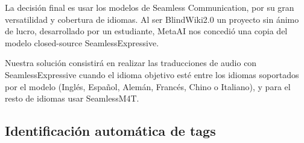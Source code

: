 La decisión final es usar los modelos de Seamless Communication, por su gran versatilidad y cobertura de idiomas. Al ser BlindWiki2.0 un proyecto sin ánimo de lucro, desarrollado por un estudiante, MetaAI nos concedió una copia del modelo closed-source SeamlessExpressive.

Nuestra solución consistirá en realizar las traducciones de audio con SeamlessExpressive cuando el idioma objetivo esté entre los idiomas soportados por el modelo (Inglés, Español, Alemán, Francés, Chino o Italiano), y para el resto de idiomas usar SeamlessM4T.

\subsection{Identificación automática de tags}

